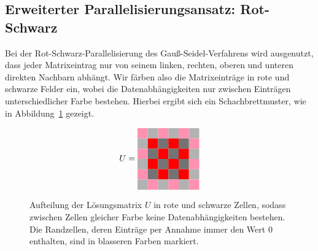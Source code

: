 \documentclass{article}
\begin{document}

\subsection{Erweiterter Parallelisierungsansatz: Rot-Schwarz}

Bei der Rot-Schwarz-Parallelisierung des Gauß-Seidel-Verfahrens wird ausgenutzt, dass jeder Matrixeintrag nur von seinem linken, rechten, oberen und unteren direkten Nachbarn abhängt. Wir färben also die Matrixeinträge in rote und schwarze Felder ein, wobei die Datenabhängigkeiten nur zwischen Einträgen unterschiedlicher Farbe bestehen. Hierbei ergibt sich ein Schachbrettmuster, wie in Abbildung~\ref{fig:matrix} gezeigt.

\begin{figure}[h!]
\centering
$$U = 
\begin{tabular}{cccccc}
  \cellcolor{rose} & \cellcolor[gray]{0.7} & \cellcolor{rose} & \cellcolor[gray]{0.7} & \cellcolor{rose} & \cellcolor[gray]{0.7}\\
 \cellcolor[gray]{0.7} & \cellcolor{red} & \cellcolor[gray]{0.45} & \cellcolor{red} & \cellcolor[gray]{0.45} & \cellcolor{rose}\\
  \cellcolor{rose} & \cellcolor[gray]{0.45} & \cellcolor{red} & \cellcolor[gray]{0.45} & \cellcolor{red} & \cellcolor[gray]{0.7}\\
 \cellcolor[gray]{0.7} & \cellcolor{red} & \cellcolor[gray]{0.45} & \cellcolor{red} & \cellcolor[gray]{0.45} & \cellcolor{rose} \\
 \cellcolor{rose} & \cellcolor[gray]{0.45} & \cellcolor{red} & \cellcolor[gray]{0.45} & \cellcolor{red} & \cellcolor[gray]{0.7}\\
 \cellcolor[gray]{0.7} & \cellcolor{rose} & \cellcolor[gray]{0.7} & \cellcolor{rose} & \cellcolor[gray]{0.7} & \cellcolor{rose}\\
\end{tabular}
$$
\caption{Aufteilung der Lösungsmatrix $U$ in rote und schwarze Zellen, sodass zwischen Zellen gleicher Farbe keine Datenabhängigkeiten bestehen. Die Randzellen, deren Einträge per Annahme immer den Wert $0$ enthalten, sind in blasseren Farben markiert.}
\label{fig:matrix}
\end{figure}
\end{document}

